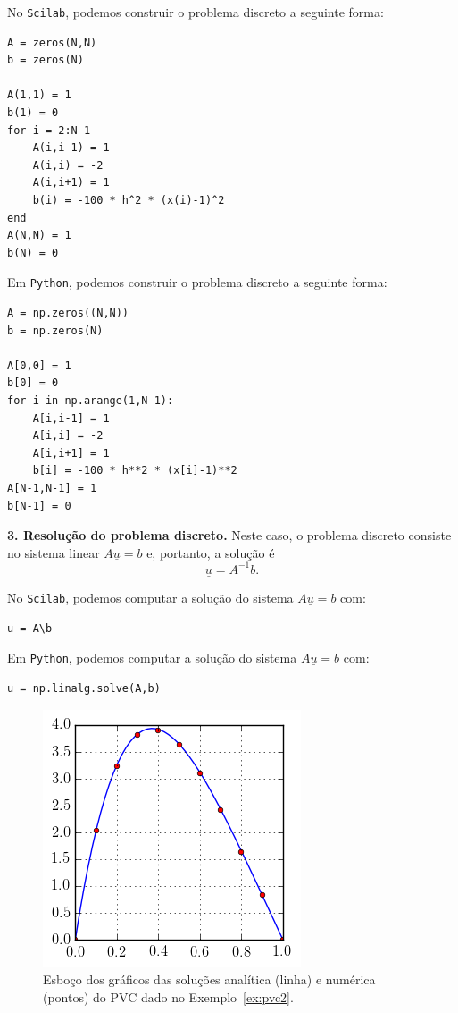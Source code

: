 \begin{sol}
\ifisscilab
No \verb+Scilab+, podemos construir o problema discreto a seguinte forma:
\begin{verbatim}
A = zeros(N,N)
b = zeros(N)

A(1,1) = 1
b(1) = 0
for i = 2:N-1
    A(i,i-1) = 1
    A(i,i) = -2
    A(i,i+1) = 1
    b(i) = -100 * h^2 * (x(i)-1)^2
end
A(N,N) = 1
b(N) = 0
\end{verbatim}
\fi
\ifispython
Em \verb+Python+, podemos construir o problema discreto a seguinte forma:
\begin{verbatim}
A = np.zeros((N,N))
b = np.zeros(N)

A[0,0] = 1
b[0] = 0
for i in np.arange(1,N-1):
    A[i,i-1] = 1
    A[i,i] = -2
    A[i,i+1] = 1
    b[i] = -100 * h**2 * (x[i]-1)**2
A[N-1,N-1] = 1
b[N-1] = 0
\end{verbatim}
\fi

{\bf 3. Resolução do problema discreto.} Neste caso, o problema discreto consiste no sistema linear $A\underline{u} = b$ e, portanto, a solução é
\begin{equation}\label{eq:pvc2_numerica}
  \underline{u} = A^{-1}b.
\end{equation}

\ifisscilab
No \verb+Scilab+, podemos computar a solução do sistema $A\underline{u} = b$ com:
\begin{verbatim}
u = A\b
\end{verbatim}
\fi
\ifispython
Em \verb+Python+, podemos computar a solução do sistema $A\underline{u} = b$ com:
\begin{verbatim}
u = np.linalg.solve(A,b)
\end{verbatim}
\fi

\begin{figure}
  \centering
  \includegraphics{./cap_pvc/pics/ex_pvc2/ex_pvc2}
  \caption{Esboço dos gráficos das soluções analítica (linha) e numérica (pontos) do PVC dado no Exemplo~\ref{ex:pvc2}.}
  \label{fig:ex_pvc2}
\end{figure}


\end{sol}
